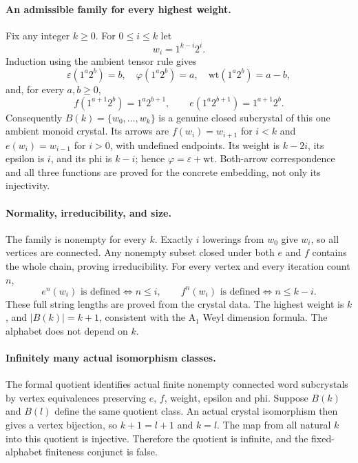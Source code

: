 \documentclass[11pt]{article}
\begin{document}
\paragraph{An admissible family for every highest weight.}
Fix any integer $k\geq0$. For $0\leq i\leq k$ let
\[
w_i=1^{k-i}2^i.
\]
Induction using the ambient tensor rule gives
\[
\varepsilon(1^a2^b)=b,\quad \varphi(1^a2^b)=a,
\quad \mathrm{wt}(1^a2^b)=a-b,
\]
and, for every $a,b\geq0$,
\[
f(1^{a+1}2^b)=1^a2^{b+1},\qquad
e(1^a2^{b+1})=1^{a+1}2^b.
\]
Consequently $B(k)=\{w_0,\ldots,w_k\}$ is a genuine closed subcrystal of this one ambient monoid crystal. Its arrows are $f(w_i)=w_{i+1}$ for $i<k$ and $e(w_i)=w_{i-1}$ for $i>0$, with undefined endpoints. Its weight is $k-2i$, its epsilon is $i$, and its phi is $k-i$; hence $\varphi=\varepsilon+\mathrm{wt}$. Both-arrow correspondence and all three functions are proved for the concrete embedding, not only its injectivity.

\paragraph{Normality, irreducibility, and size.}
The family is nonempty for every $k$. Exactly $i$ lowerings from $w_0$ give $w_i$, so all vertices are connected. Any nonempty subset closed under both $e$ and $f$ contains the whole chain, proving irreducibility. For every vertex and every iteration count $n$,
\[
e^n(w_i)\text{ is defined}\iff n\leq i,\qquad
f^n(w_i)\text{ is defined}\iff n\leq k-i.
\]
These full string lengths are proved from the crystal data. The highest weight is $k$, and $|B(k)|=k+1$, consistent with the A$_1$ Weyl dimension formula. The alphabet does not depend on $k$.

\paragraph{Infinitely many actual isomorphism classes.}
The formal quotient identifies actual finite nonempty connected word subcrystals by vertex equivalences preserving $e$, $f$, weight, epsilon and phi. Suppose $B(k)$ and $B(l)$ define the same quotient class. An actual crystal isomorphism then gives a vertex bijection, so $k+1=l+1$ and $k=l$. The map from all natural $k$ into this quotient is injective. Therefore the quotient is infinite, and the fixed-alphabet finiteness conjunct is false.
\end{document}
